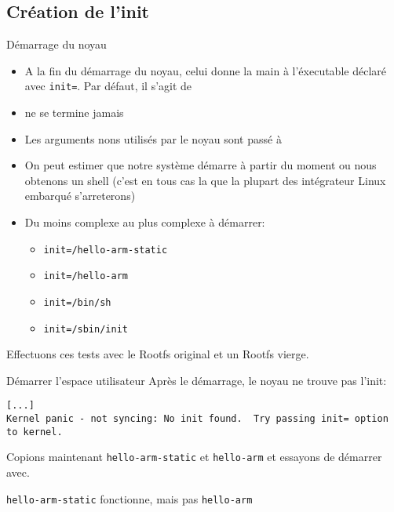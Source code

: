 \subsection{Création de l'init}

\begin{frame}[fragile=singleslide]{Démarrage du noyau}
  \begin{itemize}
  \item  A  la fin  du  démarrage  du noyau,  celui  donne  la main  à
    l'éxecutable déclaré  avec \verb+init=+. Par défaut,  il s'agit de
  \item {} ne se termine jamais
  \item  Les  arguments  nons  utilisés  par le  noyau  sont  passé  à
  \item On peut  estimer que notre système démarre  à partir du moment
    ou nous  obtenons un shell (c'est  en tous cas  la que la
      plupart des intégrateur Linux embarqué s'arreterons)
  \item Du moins complexe au plus complexe à démarrer:
  \begin{itemize}
    \item \verb+init=/hello-arm-static+
    \item \verb+init=/hello-arm+
    \item \verb+init=/bin/sh+
    \item \verb+init=/sbin/init+
    \end{itemize}
  \end{itemize}
  Effectuons ces tests avec le Rootfs original et un Rootfs vierge.
\end{frame}

\begin{frame}[fragile=singleslide]{Démarrer l'espace utilisateur}
  Après le démarrage, le noyau ne trouve pas l'init:
    \begin{lstlisting}
[...]
Kernel panic - not syncing: No init found.  Try passing init= option to kernel.
    \end{lstlisting}

    Copions maintenant  \verb+hello-arm-static+ et \verb+hello-arm+ et
    essayons de démarrer avec.

     \verb+hello-arm-static+ fonctionne, mais pas \verb+hello-arm+
\end{frame}

